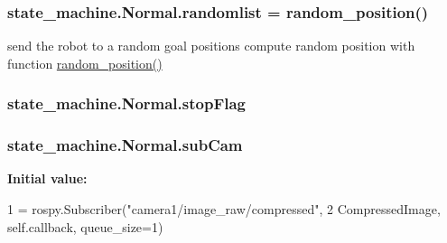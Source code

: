 \subsubsection[{\texorpdfstring{randomlist}{randomlist}}]{\setlength{\rightskip}{0pt plus 5cm}state\+\_\+machine.\+Normal.\+randomlist = {\bf random\+\_\+position}()\hspace{0.3cm}{\ttfamily [static]}}\hypertarget{classstate__machine_1_1Normal_ac4a9f6b5f01a6edbde7d181dea3bd92a}{}\label{classstate__machine_1_1Normal_ac4a9f6b5f01a6edbde7d181dea3bd92a}


send the robot to a random goal positions compute random position with function \hyperlink{namespacestate__machine_ad624b5f98b8358f20b7cecc4b88c9f52}{random\+\_\+position()} 

\subsubsection[{\texorpdfstring{stop\+Flag}{stopFlag}}]{\setlength{\rightskip}{0pt plus 5cm}state\+\_\+machine.\+Normal.\+stop\+Flag\hspace{0.3cm}{\ttfamily [static]}}\hypertarget{classstate__machine_1_1Normal_a27eca8cdd2bee790ad3eecd42c23e3b5}{}\label{classstate__machine_1_1Normal_a27eca8cdd2bee790ad3eecd42c23e3b5}
\subsubsection[{\texorpdfstring{sub\+Cam}{subCam}}]{\setlength{\rightskip}{0pt plus 5cm}state\+\_\+machine.\+Normal.\+sub\+Cam\hspace{0.3cm}{\ttfamily [static]}}\hypertarget{classstate__machine_1_1Normal_a813c3112edc54d4146e8c07ef6f7e040}{}\label{classstate__machine_1_1Normal_a813c3112edc54d4146e8c07ef6f7e040}
{\bfseries Initial value\+:}
\begin{DoxyCode}
1 = rospy.Subscriber(\textcolor{stringliteral}{"camera1/image\_raw/compressed"},
2                                            CompressedImage, self.callback,  queue\_size=1)
\end{DoxyCode}
